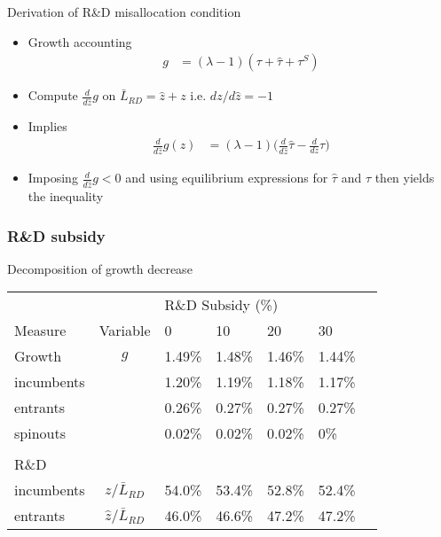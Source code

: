 \documentclass[english,usenames,dvipsnames]{beamer}
\begin{document}
\begin{frame}{Derivation of R\&D misallocation condition}\label{misallocation_of_rd:derivation}
	\hyperlink{misallocation_of_rd}{}
	\begin{itemize}
		\item Growth accounting
		\begin{align*}
			g &= (\lambda - 1) (\tau + \hat{\tau} + \tau^S)
		\end{align*}
		\item Compute $\frac{d}{d\hat{z}} g$ on $\bar{L}_{RD} = \hat{z} + z$ i.e. $dz /d\hat{z} = -1$
		\item Implies
		\begin{align}
			\frac{d}{d\hat{z}} g(z) &= (\lambda -1) \Big(\frac{d}{d\hat{z}} \hat{\tau} - \frac{d}{dz} \tau \Big)
		\end{align}
		\item Imposing $\frac{d}{d\hat{z}} g < 0$ and using equilibrium expressions for $\hat{\tau}$ and $\tau$ then yields the inequality
	\end{itemize}
\end{frame}

\subsubsection{R\&D subsidy}

\begin{frame}{Decomposition of growth decrease}\label{rd_subsidies:decomposition_growth_decrease}
	\hyperlink{RDsubsidy_table}{}
	\begin{table}
		\centering
		\small
		\begin{tabular}{lclllll}
			\toprule \toprule
			&  & \multicolumn{4}{l}{R\&D Subsidy (\%)} \vspace{3pt} \tabularnewline
			Measure &Variable & 0 & 10 & 20 & 30 \tabularnewline
			\midrule
			Growth & $g$ & 1.49\% & 1.48\% & 1.46\% & 1.44\% \tabularnewline
			\multicolumn{1}{l}{\quad incumbents} & & 1.20\% & 1.19\% & 1.18\% & 1.17\% \tabularnewline
			\multicolumn{1}{l}{\quad entrants} & & 0.26\% & 0.27\% & 0.27\% & 0.27\% \tabularnewline
			\multicolumn{1}{l}{\quad spinouts} &  & 0.02\% & 0.02\% & 0.02\% & 0\% \tabularnewline
			\tabularnewline
			R\&D & &  &  &  & \tabularnewline
			\multicolumn{1}{l}{\quad incumbents} & $z / \bar{L}_{RD}$ & 54.0\% & 53.4\% & 52.8\% & 52.4\% \tabularnewline
			\multicolumn{1}{l}{\quad entrants} & $\hat{z} / \bar{L}_{RD}$ & 46.0\% & 46.6\% & 47.2\% & 47.2\% \tabularnewline
			\bottomrule
		\end{tabular}
	\end{table}
\end{frame}
\end{document}
